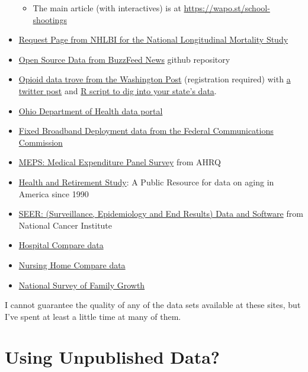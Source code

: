 \documentclass[]{book}
\providecommand{\tightlist}{%
  \setlength{\itemsep}{0pt}\setlength{\parskip}{0pt}}
\begin{document}
\begin{itemize}
  \begin{itemize}
  \tightlist
  \item
    The main article (with interactives) is at \url{https://wapo.st/school-shootings}
  \end{itemize}
\item
  \href{https://biolincc.nhlbi.nih.gov/studies/nlms/}{Request Page from NHLBI for the National Longitudinal Mortality Study}
\item
  \href{https://github.com/BuzzFeedNews}{Open Source Data from BuzzFeed News} github repository
\item
  \href{https://t.co/W4zgzRJWUI?amp=1}{Opioid data trove from the Washington Post} (registration required) with \href{https://twitter.com/aleszubajak/status/1152311687317479424?s=11}{a twitter post} and \href{https://gist.github.com/aleszu/c13bb718a0b1d7de429900ab5f8004f3}{R script to dig into your state's data}.
\item
  \href{https://odh.ohio.gov/wps/portal/gov/odh/explore-data-and-stats}{Ohio Department of Health data portal}
\item
  \href{https://broadbandmap.fcc.gov/\#/}{Fixed Broadband Deployment data from the Federal Communications Commission}
\item
  \href{https://www.meps.ahrq.gov/mepsweb/}{MEPS: Medical Expenditure Panel Survey} from AHRQ
\item
  \href{http://hrsonline.isr.umich.edu/}{Health and Retirement Study}: A Public Resource for data on aging in America since 1990
\item
  \href{https://seer.cancer.gov/data-software/}{SEER: (Surveillance, Epidemiology and End Results) Data and Software} from National Cancer Institute
\item
  \href{https://www.medicare.gov/hospitalcompare/Data/Data-Updated.html\#}{Hospital Compare data}
\item
  \href{https://data.medicare.gov/data/nursing-home-compare}{Nursing Home Compare data}
\item
  \href{https://www.cdc.gov/nchs/nsfg/index.htm}{National Survey of Family Growth}
\end{itemize}

I cannot guarantee the quality of any of the data sets available at these sites, but I've spent at least a little time at many of them.

\hypertarget{using-unpublished-data}{%
\section{Using Unpublished Data?}\label{using-unpublished-data}}
\end{document}
